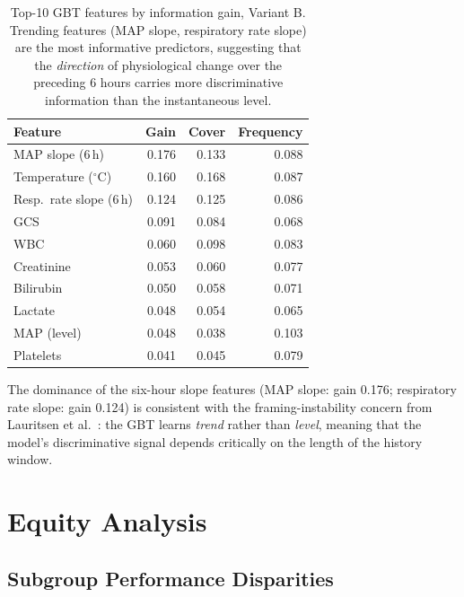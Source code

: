 \begin{table}[H]
  \centering
  \begin{tabular}{lrrr}
    \toprule
    \textbf{Feature} & \textbf{Gain} & \textbf{Cover} & \textbf{Frequency} \\
    \midrule
    MAP slope (6\,h)          & 0.176 & 0.133 & 0.088 \\
    Temperature ($^\circ$C)   & 0.160 & 0.168 & 0.087 \\
    Resp.\ rate slope (6\,h)  & 0.124 & 0.125 & 0.086 \\
    GCS                       & 0.091 & 0.084 & 0.068 \\
    WBC                       & 0.060 & 0.098 & 0.083 \\
    Creatinine                & 0.053 & 0.060 & 0.077 \\
    Bilirubin                 & 0.050 & 0.058 & 0.071 \\
    Lactate                   & 0.048 & 0.054 & 0.065 \\
    MAP (level)               & 0.048 & 0.038 & 0.103 \\
    Platelets                 & 0.041 & 0.045 & 0.079 \\
    \bottomrule
  \end{tabular}
  \caption{Top-10 GBT features by information gain, Variant B. Trending
  features (MAP slope, respiratory rate slope) are the most informative
  predictors, suggesting that the \textit{direction} of physiological change
  over the preceding 6 hours carries more discriminative information than the
  instantaneous level.}
  \label{tab:feature_importance}
\end{table}

The dominance of the six-hour slope features (MAP slope: gain 0.176; respiratory
rate slope: gain 0.124) is consistent with the framing-instability concern from
Lauritsen et al.\ \parencite{lauritsen2021framing}: the GBT learns
\textit{trend} rather than \textit{level}, meaning that the model's discriminative
signal depends critically on the length of the history window.

\section{Equity Analysis}
\label{sec:equity}

\subsection{Subgroup Performance Disparities}

